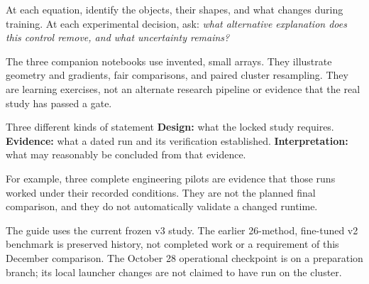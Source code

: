 \documentclass[11pt,letterpaper]{article}
\begin{document}
At each equation, identify the objects, their shapes, and what changes during
training. At each experimental decision, ask: \emph{what alternative explanation
does this control remove, and what uncertainty remains?}

The three companion notebooks use invented, small arrays. They illustrate
geometry and gradients, fair comparisons, and paired cluster resampling. They
are learning exercises, not an alternate research pipeline or evidence that
the real study has passed a gate.

\begin{caution}{Three different kinds of statement}
\textbf{Design:} what the locked study requires.\quad
\textbf{Evidence:} what a dated run and its verification established.\quad
\textbf{Interpretation:} what may reasonably be concluded from that evidence.

For example, three complete engineering pilots are evidence that those runs
worked under their recorded conditions. They are not the planned final
comparison, and they do not automatically validate a changed runtime.
\end{caution}

The guide uses the current frozen v3 study. The earlier 26-method, fine-tuned
v2 benchmark is preserved history, not completed work or a requirement of this
December comparison. The October 28 operational checkpoint is on a preparation
branch; its local launcher changes are not claimed to have run on the cluster.







\end{document}
